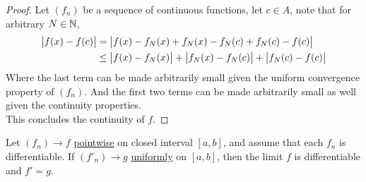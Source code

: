\documentclass[11pt]{article}
\begin{document}
	\begin{proof}
		Let $(f_n)$ be a sequence of continuous functions, let $c \in A$, note that for arbitrary $N \in \mathbb{N}$, 
		\begin{align}
			\big \vert {f(x) - f(c)} \big \vert &= \big \vert {f(x) - f_N(x) + f_N(x) - f_N(c) + f_N(c) - f(c)} \big \vert \\
			&\leq \big \vert {f(x) - f_N(x)} \big \vert + \big \vert {f_N(x) - f_N(c)} \big \vert + \big \vert {f_N(c) - f(c)} \big \vert
		\end{align}
		Where the last term can be made arbitrarily small given the uniform convergence property of $(f_n)$. And the first two terms can be made arbitrarily small as well given the continuity properties. \\
		This concludes the continuity of $f$. 
	\end{proof}
	
	\begin{theorem}
		Let $(f_n) \to f$ \ul{pointwise} on closed interval $[a, b]$, and assume that each $f_n$ is differentiable.
		If $(f'_n) \to g$ \ul{uniformly} on $[a, b]$, then the limit $f$ is differentiable and $f' = g$.
	\end{theorem}
	
\end{document}
